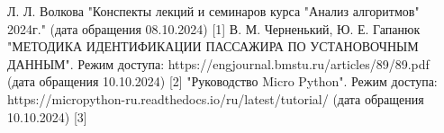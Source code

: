 \begin{thebibliography}{}
	 Л. Л. Волкова "Конспекты лекций и семинаров курса "Анализ алгоритмов" 2024г." (дата обращения 08.10.2024) [1]
	 В. М. Черненький, Ю. Е. Гапанюк "МЕТОДИКА ИДЕНТИФИКАЦИИ ПАССАЖИРА ПО УСТАНОВОЧНЫМ ДАННЫМ". Режим доступа: https://engjournal.bmstu.ru/articles/89/89.pdf (дата обращения 10.10.2024) [2]
	 "Руководство Micro Python". Режим доступа: https://micropython-ru.readthedocs.io/ru/latest/tutorial/ (дата обращения 10.10.2024) [3]
\end{thebibliography}
